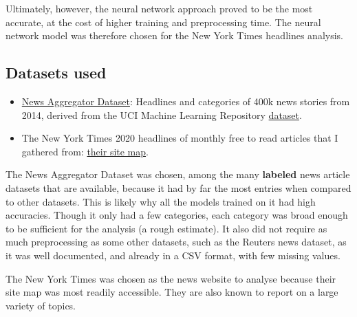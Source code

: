 \documentclass[11pt]{article}
\begin{document}
Ultimately, however, the neural network approach proved to be the most
accurate, at the cost of higher training and preprocessing time. The neural
network model was therefore chosen for the New York Times headlines analysis.

\subsection*{Datasets used}

\begin{itemize}
\item
\href{https://www.kaggle.com/uciml/news-aggregator-dataset}
{News Aggregator Dataset}:
Headlines and categories of 400k news stories from 2014,
derived from the UCI Machine Learning Repository
\href{http://archive.ics.uci.edu/ml/datasets/News+Aggregator}{dataset}.
\item
The New York Times 2020 headlines of monthly free to read articles that I
gathered from:
\href{https://spiderbites.nytimes.com/2020/}
{their site map}.
\end{itemize}

The News Aggregator Dataset was chosen, among the many \textbf{labeled} news
article datasets that are available, because it had by far the most entries
when compared to other datasets. This is likely why all the models trained on
it had high accuracies. Though it only had a few categories, each category
was broad enough to be sufficient for the analysis (a rough estimate). It
also did not require as much preprocessing as some other datasets, such as
the Reuters news dataset, as it was well documented, and already in a CSV
format, with few missing values.

The New York Times was chosen as the news website to analyse because their
site map was most readily accessible. They are also known to report on a
large variety of topics.
\end{document}
